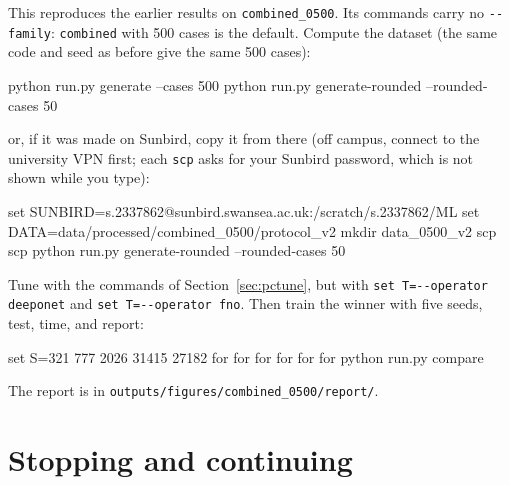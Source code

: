 \documentclass[11pt,a4paper]{article}
\newcommand{\code}[1]{\lstinline{#1}}
\begin{document}
This reproduces the earlier results on \code{combined_0500}. Its commands carry no
\code{--family}: \code{combined} with 500 cases is the default. Compute the dataset (the same
code and seed as before give the same 500 cases):

\begin{cmd}
python run.py generate --cases 500
python run.py generate-rounded --rounded-cases 50
\end{cmd}

or, if it was made on Sunbird, copy it from there (off campus, connect to the university VPN
first; each \code{scp} asks for your Sunbird password, which is not shown while you type):

\begin{cmd}
set SUNBIRD=s.2337862@sunbird.swansea.ac.uk:/scratch/s.2337862/ML
set DATA=data/processed/combined_0500/protocol_v2
mkdir data\processed\combined_0500\protocol_v2
scp %
scp %
python run.py generate-rounded --rounded-cases 50
\end{cmd}

Tune with the commands of Section~\ref{sec:pctune}, but with
\code{set T=--operator deeponet} and \code{set T=--operator fno}. Then train the winner with
five seeds, test, time, and report:

\begin{cmd}
set S=321 777 2026 31415 27182
for %
for %
for %
for %
for %
for %
python run.py compare
\end{cmd}

The report is in \code{outputs/figures/combined_0500/report/}.

\section{Stopping and continuing}\label{sec:resume}
\end{document}
